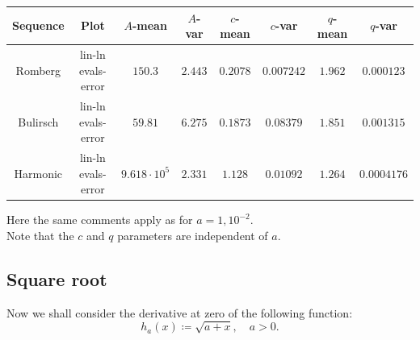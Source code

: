 \begin{table}[H]
    \centering
    \small
    \begin{tabular}{c|c||c|c|c|c|c|c}
Sequence & Plot & \(A\)-mean & \(A\)-var & \(c\)-mean & \(c\)-var & \(q\)-mean & \(q\)-var\\\hline
Romberg & lin-ln evals-error & \(150.3\) & \(2.443\) & \(0.2078\) & \(0.007242\) & \(1.962\) & \(0.000123\) \\
Bulirsch & lin-ln evals-error & \(59.81\) & \(6.275\) & \(0.1873\) & \(0.08379\) & \(1.851\) & \(0.001315\) \\
Harmonic & lin-ln evals-error & \(9.618\cdot 10^{5}\) & \(2.331\) & \(1.128\) & \(0.01092\) & \(1.264\) & \(0.0004176\) \\
    \end{tabular}
    \label{tab:my_label}
\end{table}

Here the same comments apply as for \(a= 1,10^{-2}\).\\

Note that the \(c\) and \(q\) parameters are independent of \(a\).

\subsection{Square root}

Now we shall consider the derivative at zero of the following function:
\[
h_a(x) \coloneqq \sqrt{a + x}, \quad a > 0.
\]

